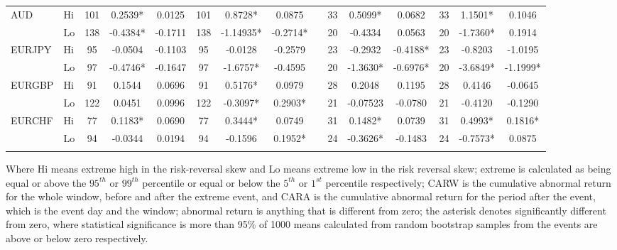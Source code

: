 \documentclass[preprint,12pt,authoryear]{elsarticle}
\begin{document}
\begin{table}
\begin{threeparttable}
\begin{tabular}{llccccccccccccc}
\multirow{2}{*}{AUD}
& Hi & 101 &0.2539* &0.0125 &101 &0.8728* & 0.0875 &  &33 &0.5099* &0.0682 &33 & 1.1501*& 0.1046  \\ 
& Lo & 138 &-0.4384* & -0.1711 & 138 & -1.14935* & -0.2714* & &20 &-0.4334 & 0.0563 &20  & -1.7360* & 0.1914  \\
\multirow{2}{*}{EURJPY}
& Hi & 95 &-0.0504 &-0.1103 &95 &-0.0128 &-0.2579 & &23 &-0.2932 &-0.4188* &23 &-0.8203 & -1.0195  \\ 
& Lo & 97 &-0.4746* & -0.1647 &97 &-1.6757* &-0.4595 & &20 &-1.3630* & -0.6976* & 20 & -3.6849* &-1.1999*  \\
\multirow{2}{*}{EURGBP}
& Hi & 91 & 0.1544 &0.0696 &91 &0.5176* &0.0979 & &28 &0.2048 &0.1195 &28 & 0.4146 & -0.0645  \\ 
& Lo & 122 & 0.0451 & 0.0996 &122 &-0.3097* &0.2903* & & 21 &-0.07523 &-0.0780 &21 & -0.4120 &
-0.1290  \\
\multirow{2}{*}{EURCHF}
& Hi & 77 & 0.1183* & 0.0690 &77 & 0.3444* & 0.0749& & 	31 & 0.1482* &0.0739  &31 & 0.4993* 
& 0.1816*  \\ 
& Lo & 94 &-0.0344 & 0.0194 & 94 & -0.1596 &0.1952* & &24 & -0.3626* &-0.1483 & 24 & -0.7573* 
& 0.0875  \\
\hline
\label{tabref:RR1}
\end{tabular}
\begin{tablenotes}
\small 
\item Where Hi means extreme high in the risk-reversal skew and Lo means extreme low in the risk reversal skew; extreme is calculated as being equal or above the $95^{th}$ or $99^{th}$ percentile or equal or below the $5^{th}$ or $1^{st}$ percentile respectively; CARW is the cumulative abnormal return for the whole window, before and after the extreme event, and CARA is the cumulative abnormal return for the period after the event, which is the event day and the window; abnormal return is anything that is different from zero; the asterisk denotes significantly different from zero, where statistical significance is more than 95\% of 1000 means calculated from random bootstrap samples from the events are above or below zero respectively.   
\end{tablenotes}
\end{threeparttable}  
\end{table}
\end{document}
